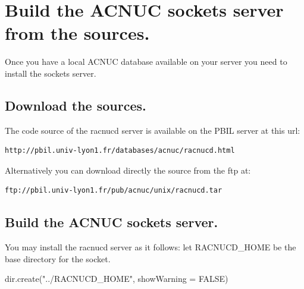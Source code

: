 \documentclass{article}
\begin{document}
\section{Build the ACNUC sockets server from the sources.}

Once you have a local  ACNUC database available on your server you need to install the sockets server.

\subsection{Download the sources.}
The code source of the racnucd server is available on the PBIL server  at this url:
\begin{verbatim}
http://pbil.univ-lyon1.fr/databases/acnuc/racnucd.html
\end{verbatim}
Alternatively you can download directly  the source from the ftp at:
\begin{verbatim}
ftp://pbil.univ-lyon1.fr/pub/acnuc/unix/racnucd.tar
\end{verbatim}

\subsection{Build the ACNUC sockets server.}
You may install the racnucd server as it follows:
let RACNUCD\_HOME be the base directory for the socket.

\begin{Schunk}
\begin{Sinput}
 dir.create("../RACNUCD_HOME", showWarning = FALSE)
\end{Sinput}
\end{Schunk}
\end{document}
